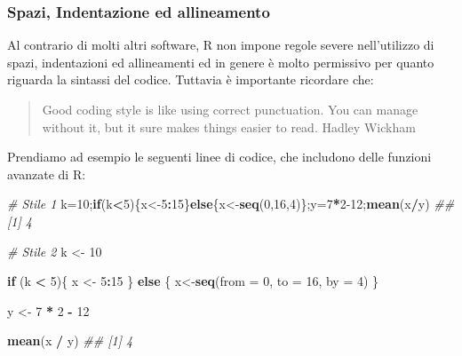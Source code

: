 \documentclass[
]{book}
\newenvironment{Shaded}{\begin{snugshade}}{\end{snugshade}}
\newcommand{\CommentTok}[1]{\textcolor[rgb]{0.56,0.35,0.01}{\textit{#1}}}
\newcommand{\ControlFlowTok}[1]{\textcolor[rgb]{0.13,0.29,0.53}{\textbf{#1}}}
\newcommand{\DataTypeTok}[1]{\textcolor[rgb]{0.13,0.29,0.53}{#1}}
\newcommand{\DecValTok}[1]{\textcolor[rgb]{0.00,0.00,0.81}{#1}}
\newcommand{\KeywordTok}[1]{\textcolor[rgb]{0.13,0.29,0.53}{\textbf{#1}}}
\newcommand{\NormalTok}[1]{#1}
\newcommand{\OperatorTok}[1]{\textcolor[rgb]{0.81,0.36,0.00}{\textbf{#1}}}
\newcommand{\StringTok}[1]{\textcolor[rgb]{0.31,0.60,0.02}{#1}}
\begin{document}
\hypertarget{spazi-indentazione-ed-allineamento}{%
\subsubsection*{Spazi, Indentazione ed allineamento}\label{spazi-indentazione-ed-allineamento}}

Al contrario di molti altri software, R non impone regole severe nell'utilizzo di spazi, indentazioni ed allineamenti ed in genere è molto permissivo per quanto riguarda la sintassi del codice. Tuttavia è importante ricordare che:

\begin{quote}
Good coding style is like using correct punctuation. You can manage without it, but it sure makes things easier to read. Hadley Wickham
\end{quote}

Prendiamo ad esempio le seguenti linee di codice, che includono delle funzioni avanzate di R:

\begin{Shaded}
\begin{Highlighting}[]
\CommentTok{# Stile 1}
\NormalTok{k=}\DecValTok{10}\NormalTok{;}\ControlFlowTok{if}\NormalTok{(k}\OperatorTok{<}\DecValTok{5}\NormalTok{)\{x<-}\DecValTok{5}\OperatorTok{:}\DecValTok{15}\NormalTok{\}}\ControlFlowTok{else}\NormalTok{\{x<-}\KeywordTok{seq}\NormalTok{(}\DecValTok{0}\NormalTok{,}\DecValTok{16}\NormalTok{,}\DecValTok{4}\NormalTok{)\};y=}\DecValTok{7}\OperatorTok{*}\DecValTok{2-12}\NormalTok{;}\KeywordTok{mean}\NormalTok{(x}\OperatorTok{/}\NormalTok{y)}
\CommentTok{## [1] 4}

\CommentTok{# Stile 2}
\NormalTok{k <-}\StringTok{  }\DecValTok{10}

\ControlFlowTok{if}\NormalTok{ (k }\OperatorTok{<}\StringTok{ }\DecValTok{5}\NormalTok{)\{}
\NormalTok{  x <-}\StringTok{ }\DecValTok{5}\OperatorTok{:}\DecValTok{15}
\NormalTok{\} }\ControlFlowTok{else}\NormalTok{ \{}
\NormalTok{  x<-}\KeywordTok{seq}\NormalTok{(}\DataTypeTok{from =} \DecValTok{0}\NormalTok{, }\DataTypeTok{to =} \DecValTok{16}\NormalTok{, }\DataTypeTok{by =} \DecValTok{4}\NormalTok{)}
\NormalTok{\}}

\NormalTok{y <-}\StringTok{ }\DecValTok{7} \OperatorTok{*}\StringTok{ }\DecValTok{2} \OperatorTok{-}\StringTok{ }\DecValTok{12}

\KeywordTok{mean}\NormalTok{(x }\OperatorTok{/}\StringTok{ }\NormalTok{y)}
\CommentTok{## [1] 4}
\end{Highlighting}
\end{Shaded}
\end{document}
